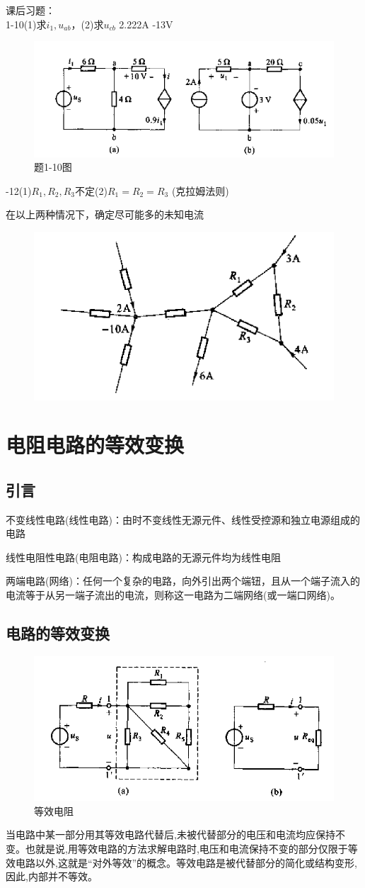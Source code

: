 \documentclass[11pt,a4paper,oneside]{book}
\begin{document}
~\\
~\\
课后习题：
~\\
1-10\qquad(1)求$i_1,u_{ab}$，(2)求$u_{cb}$ \quad 2.222A \quad  -13V
\begin{figure}[H]
	\centering
	\includegraphics[width=0.7\linewidth]{screenshot011}
	\caption{题1-10图}
	\label{fig:screenshot011}
\end{figure}

-12\qquad (1)$R_1,R_2,R_3不定$(2)$R_1=R_2=R_3$ (克拉姆法则)\par 在以上两种情况下，确定尽可能多的未知电流
\begin{figure}[H]
	\centering
	\includegraphics[width=0.5\linewidth]{screenshot012}
	\caption{}
	\label{fig:screenshot012}
\end{figure}

\chapter{电阻电路的等效变换}
\section{引言}
不变线性电路(线性电路)：由时不变线性无源元件、线性受控源和独立电源组成的电路 \par 线性电阻性电路(电阻电路)：构成电路的无源元件均为线性电阻 \par
两端电路(网络)：任何一个复杂的电路，向外引出两个端钮，且从一个端子流入的电流等于从另一端子流出的电流，则称这一电路为二端网络(或一端口网络)。
\section{电路的等效变换}
\begin{figure}[H]
	\centering
	\includegraphics[width=0.4\linewidth]{screenshot129}
	\caption{等效电阻}
	\label{fig:screenshot129}
\end{figure}
当电路中某一部分用其等效电路代替后,未被代替部分的电压和电流均应保持不变。也就是说,用等效电路的方法求解电路时,电压和电流保持不变的部分仅限于等效电路以外,这就是“对外等效”的概念。等效电路是被代替部分的简化或结构变形,因此,内部并不等效。
\end{document}
